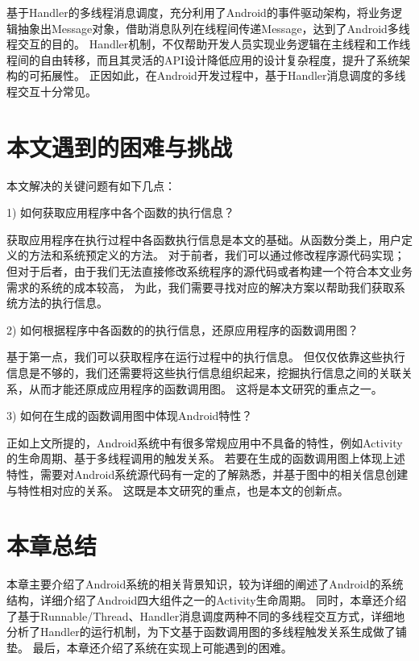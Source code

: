基于Handler的多线程消息调度，充分利用了Android的事件驱动架构，将业务逻辑抽象出Message对象，借助消息队列在线程间传递Message，达到了Android多线程交互的目的。
Handler机制，不仅帮助开发人员实现业务逻辑在主线程和工作线程间的自由转移，而且其灵活的API设计降低应用的设计复杂程度，提升了系统架构的可拓展性。
正因如此，在Android开发过程中，基于Handler消息调度的多线程交互十分常见。


\section{本文遇到的困难与挑战}


本文解决的关键问题有如下几点：

1)	如何获取应用程序中各个函数的执行信息？

获取应用程序在执行过程中各函数执行信息是本文的基础。从函数分类上，用户定义的方法和系统预定义的方法。
对于前者，我们可以通过修改程序源代码实现；但对于后者，由于我们无法直接修改系统程序的源代码或者构建一个符合本文业务需求的系统的成本较高，
为此，我们需要寻找对应的解决方案以帮助我们获取系统方法的执行信息。

2)	如何根据程序中各函数的的执行信息，还原应用程序的函数调用图？

基于第一点，我们可以获取程序在运行过程中的执行信息。
但仅仅依靠这些执行信息是不够的，我们还需要将这些执行信息组织起来，挖掘执行信息之间的关联关系，从而才能还原成应用程序的函数调用图。
这将是本文研究的重点之一。

3)	如何在生成的函数调用图中体现Android特性？

正如上文所提的，Android系统中有很多常规应用中不具备的特性，例如Activity的生命周期、基于多线程调用的触发关系。
若要在生成的函数调用图上体现上述特性，需要对Android系统源代码有一定的了解熟悉，并基于图中的相关信息创建与特性相对应的关系。
这既是本文研究的重点，也是本文的创新点。

\section{本章总结}

本章主要介绍了Android系统的相关背景知识，较为详细的阐述了Android的系统结构，详细介绍了Android四大组件之一的Activity生命周期。
同时，本章还介绍了基于Runnable/Thread、Handler消息调度两种不同的多线程交互方式，详细地分析了Handler的运行机制，为下文基于函数调用图的多线程触发关系生成做了铺垫。
最后，本章还介绍了系统在实现上可能遇到的困难。
